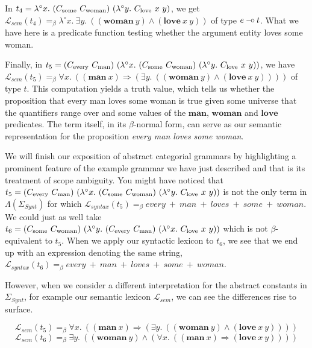 In $t_4 = \lambda^{\circ}
x.\ (C_{\textrm{some}}\ C_{\textrm{woman}})\ (\lambda^{\circ}
y.\ C_{\textrm{love}}\ x\ y)$, we get $\mathcal{L}_{sem}(t_4) =_{\beta}
\lambda^{\circ} x.\ \exists y.\ ((\textbf{woman}\ y) \land
(\textbf{love}\ x\ y))$ of type $e \mathbin{{-}\mkern-3.5mu{\circ}} t$. What we have here is a
predicate function testing whether the argument entity loves some woman.

Finally, in $t_5 = (\synt{every}\ \synt{man})\ (\lambda^{\circ}
x.\ (\synt{some}\ \synt{woman})\ (\lambda^{\circ}
y.\ \synt{love}\ x\ y))$, we have $\mathcal{L}_{sem}(t_5) =_{\beta}
\forall x.\ ((\textbf{man}\ x) \Rightarrow (\exists
y.\ ((\textbf{woman}\ y) \land (\textbf{love}\ x\ y))))$ of type
$t$. This computation yields a truth value, which tells us whether the
proposition that every man loves some woman is true given some universe
that the quantifiers range over and some values of the $\textbf{man}$,
$\textbf{woman}$ and $\textbf{love}$ predicates. The term itself, in its
$\beta$-normal form, can serve as our semantic representation for the
proposition \emph{every man loves some woman}.

We will finish our exposition of abstract categorial grammars by
highlighting a prominent feature of the example grammar we have just
described and that is its treatment of scope ambiguity. You might have
noticed that $t_5 = (\synt{every}\ \synt{man})\ (\lambda^{\circ}
x.\ (\synt{some}\ \synt{woman})\ (\lambda^{\circ}
y.\ \synt{love}\ x\ y))$ is not the only term in
$\Lambda(\Sigma_{Synt})$ for which $\mathcal{L}_{syntax}(t_5) =_{\beta}
every\ +\ man\ +\ loves\ +\ some\ +\ woman$. We could just as well take $t_6
= (C_{\textrm{some}}\ C_{\textrm{woman}})\ (\lambda^{\circ}
y.\ (C_{\textrm{every}}\ C_{\textrm{man}})\ (\lambda^{\circ}
x.\ C_{\textrm{love}}\ x\ y))$ which is not $\beta$-equivalent to $t_5$. When
we apply our syntactic lexicon to $t_6$, we see that we end up with an
expression denoting the same string, $\mathcal{L}_{syntax}(t_6)
=_{\beta} every\ +\ man\ +\ loves\ +\ some\ +\ woman$.

However, when we consider a different interpretation for the abstract
constants in $\Sigma_{Synt}$, for example our semantic lexicon
$\mathcal{L}_{sem}$, we can see the differences rise to surface.

$$
\mathcal{L}_{sem}(t_5) =_{\beta} \forall x.\ ((\textbf{man}\ x)
\Rightarrow (\exists y.\ ((\textbf{woman}\ y) \land
(\textbf{love}\ x\ y))))
$$
$$
\mathcal{L}_{sem}(t_6) =_{\beta} \exists y.\ ((\textbf{woman}\ y)
\land (\forall x.\ ((\textbf{man}\ x) \Rightarrow
(\textbf{love}\ x\ y))))
$$

